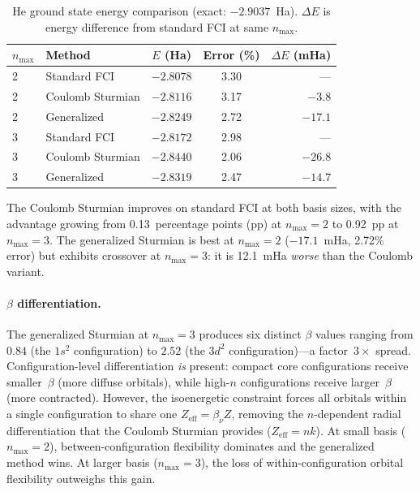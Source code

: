 \documentclass[aps,pra,twocolumn,superscriptaddress,longbibliography]{revtex4-2}
\begin{document}
\begin{table}[h]
\caption{He ground state energy comparison (exact: $-2.9037$~Ha).
  $\Delta E$ is energy difference from standard FCI at same
  $n_{\max}$.}
\label{tab:sturmian_he}
\begin{ruledtabular}
\begin{tabular}{llccr}
$n_{\max}$ & Method & $E$ (Ha) & Error (\%) & $\Delta E$ (mHa) \\
\hline
2 & Standard FCI       & $-2.8078$ & 3.30 & --- \\
2 & Coulomb Sturmian   & $-2.8116$ & 3.17 & $-3.8$ \\
2 & Generalized        & $-2.8249$ & 2.72 & $-17.1$ \\
\hline
3 & Standard FCI       & $-2.8172$ & 2.98 & --- \\
3 & Coulomb Sturmian   & $-2.8440$ & 2.06 & $-26.8$ \\
3 & Generalized        & $-2.8319$ & 2.47 & $-14.7$ \\
\end{tabular}
\end{ruledtabular}
\end{table}

The Coulomb Sturmian improves on standard FCI at both basis sizes,
with the advantage growing from 0.13~percentage points (pp) at
$n_{\max} = 2$ to 0.92~pp at $n_{\max} = 3$.  The generalized
Sturmian is best at $n_{\max} = 2$ ($-17.1$~mHa, 2.72\% error) but
exhibits crossover at $n_{\max} = 3$: it is 12.1~mHa \emph{worse}
than the Coulomb variant.

\paragraph{$\beta$ differentiation.}
The generalized Sturmian at $n_{\max} = 3$ produces six distinct
$\beta$ values ranging from $0.84$ (the $1s^2$ configuration) to
$2.52$ (the $3d^2$ configuration)---a factor~$3\times$ spread.
Configuration-level differentiation \emph{is} present: compact core
configurations receive smaller~$\beta$ (more diffuse orbitals), while
high-$n$ configurations receive larger~$\beta$ (more contracted).
However, the isoenergetic constraint forces all orbitals within a
single configuration to share one $Z_{\mathrm{eff}} = \beta_\nu Z$,
removing the $n$-dependent radial differentiation that the Coulomb
Sturmian provides ($Z_{\mathrm{eff}} = nk$).  At small basis
($n_{\max} = 2$), between-configuration flexibility dominates and the
generalized method wins.  At larger basis ($n_{\max} = 3$), the loss
of within-configuration orbital flexibility outweighs this gain.
\end{document}
